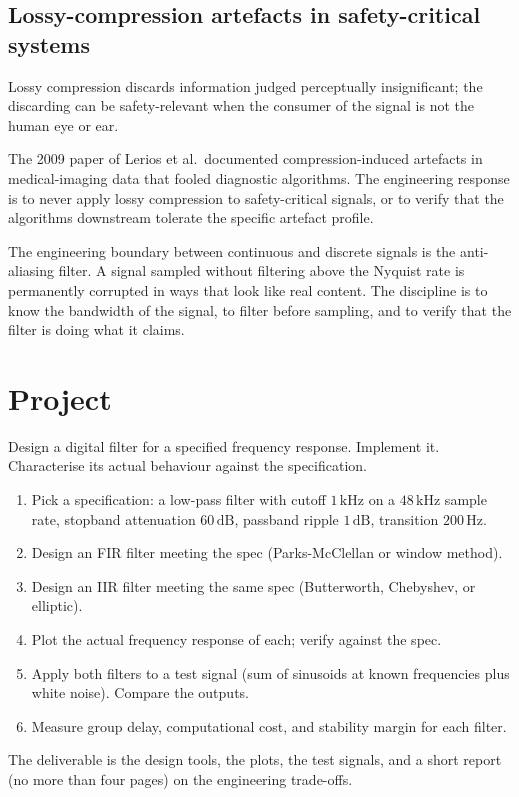 \subsection{Lossy-compression artefacts in safety-critical systems}

Lossy compression discards information judged perceptually insignificant; the discarding can be safety-relevant when the consumer of the signal is not the human eye or ear.

The 2009 paper of Lerios et al.\ documented compression-induced artefacts in medical-imaging data that fooled diagnostic algorithms. The engineering response is to never apply lossy compression to safety-critical signals, or to verify that the algorithms downstream tolerate the specific artefact profile.

\begin{principle}
The engineering boundary between continuous and discrete signals is the anti-aliasing filter. A signal sampled without filtering above the Nyquist rate is permanently corrupted in ways that look like real content. The discipline is to know the bandwidth of the signal, to filter before sampling, and to verify that the filter is doing what it claims.
\end{principle}

\section{Project}

\begin{project}
Design a digital filter for a specified frequency response. Implement it. Characterise its actual behaviour against the specification.

\begin{enumerate}[leftmargin=*]
  \item Pick a specification: a low-pass filter with cutoff $1\,\si{\kilo\hertz}$ on a $48\,\si{\kilo\hertz}$ sample rate, stopband attenuation $60\,\si{\dB}$, passband ripple $1\,\si{\dB}$, transition $200\,\si{\hertz}$.
  \item Design an FIR filter meeting the spec (Parks-McClellan or window method).
  \item Design an IIR filter meeting the same spec (Butterworth, Chebyshev, or elliptic).
  \item Plot the actual frequency response of each; verify against the spec.
  \item Apply both filters to a test signal (sum of sinusoids at known frequencies plus white noise). Compare the outputs.
  \item Measure group delay, computational cost, and stability margin for each filter.
\end{enumerate}

The deliverable is the design tools, the plots, the test signals, and a short report (no more than four pages) on the engineering trade-offs.
\end{project}

